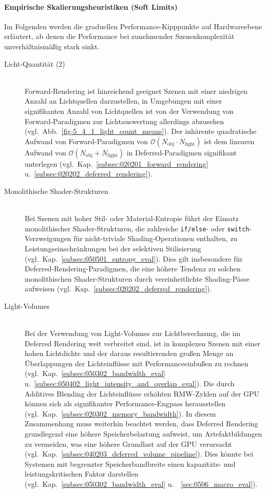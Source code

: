 \paragraph{Empirische Skalierungsheuristiken (Soft Limits)}
Im Folgenden werden die graduellen Performance-Kipppunkte auf Hardwareebene erläutert, ab denen die Performance bei
zunehmender Szenenkomplexität unverhältnismäßig stark sinkt.

\begin{description}
    \item[Licht-Quantität (2)] ~\\
    Forward-Rendering ist hinreichend geeignet Szenen mit einer niedrigen Anzahl an Lichtquellen darzustellen, in
    Umgebungen mit einer signifikanten Anzahl von Lichtquellen ist von der Verwendung von Forward-Paradigmen zur
    Lichtauswertung allerdings abzusehen (vgl.\ Abb.~\ref{fig:5_4_1_light_count_means}).
    Der inhärente quadratische Aufwand von Forward-Paradigmen von $\mathcal{O}(N_{\text{obj}} \cdot N_{\text{light}})$ ist dem linearen Aufwand von
    $\mathcal{O}(N_{\text{obj}} + N_{\text{light}})$ in Deferred-Paradigmen signifikant unterlegen
    (vgl.\ Kap.~\ref{subsec:020201_forward_rendering} u.~\ref{subsec:020202_deferred_rendering}).

    \item[Monolithische Shader-Strukturen] ~\\
    Bei Szenen mit hoher Stil- oder Material-Entropie führt der Einsatz monolithischer Shader-Strukturen, die
    zahlreiche \texttt{if/else}- oder \texttt{switch}-Verzweigungen für nicht-triviale Shading-Operationen enthalten, zu
    Leistungseinschränkungen bei der selektiven Stilisierung (vgl.\ Kap.~\ref{subsec:050501_entropy_eval}).
    Dies gilt insbesondere für Deferred-Rendering-Paradigmen, die eine höhere Tendenz zu solchen monolithischen
    Shader-Strukturen durch vereinheitlichte Shading-Pässe aufweisen (vgl.\ Kap.~\ref{subsec:020202_deferred_rendering}).

    \item[Light-Volumes] ~\\
    Bei der Verwendung von Light-Volumes zur Lichtberechnung, die im Deferred Rendering weit verbreitet sind, ist in
    komplexen Szenen mit einer hohen Lichtdichte und der daraus resultierenden großen Menge an Überlappungen der
    Lichteinflüsse mit Performanceeinbußen zu rechnen
    (vgl.\ Kap.~\ref{subsec:050302_bandwidth_eval} u.~\ref{subsec:050402_light_intensity_and_overlap_eval}).
    Die durch Additives Blending der Lichteinflüsse erhöhten \ac{RMW}-Zyklen auf der \ac{GPU} können sich als
    signifikanter Performance-Engpass herausstellen (vgl.\ Kap.~\ref{subsec:020302_memory_bandwidth}).
    In diesem Zusammenhang muss weiterhin beachtet werden, dass Deferred Rendering grundlegend eine höhere Speicherbelastung
    aufweist, um Artefaktbildungen zu vermeiden, was eine höhere Grundlast auf der \ac{GPU} verursacht
    (vgl.\ Kap.~\ref{subsec:040203_deferred_volume_pipeline}).
    Dies könnte bei Systemen mit begrenzter Speicherbandbreite einen kapazitäts- und leistungskritischen Faktor
    darstellen (vgl.\ Kap.~\ref{subsec:050302_bandwidth_eval} u.\ ~\ref{sec:0506_macro_eval}).


\end{description}
